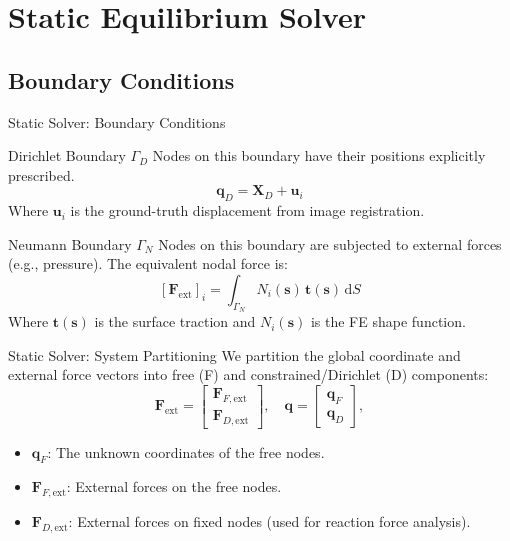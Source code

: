 \documentclass{beamer}
\begin{document}
\section{Static Equilibrium Solver}
\subsection{Boundary Conditions}

\begin{frame}[fragile]{Static Solver: Boundary Conditions}
    \begin{block}{Dirichlet Boundary $\Gamma_D$}
    Nodes on this boundary have their positions explicitly prescribed.
    \[
        \mathbf{q}_D = \mathbf{X}_D + \mathbf{u}_i
    \]
    Where $\mathbf{u}_i$ is the ground-truth displacement from image registration.
    \end{block}
    
    \begin{block}{Neumann Boundary $\Gamma_N$}
    Nodes on this boundary are subjected to external forces (e.g., pressure). The equivalent nodal force is:
    \[
        [\mathbf{F}_{\text{ext}}]_i = \int_{\Gamma_N} N_i(\mathbf{s})\,\mathbf{t}(\mathbf{s})\,\mathrm{d}S
    \]
    Where $\mathbf{t}(\mathbf{s})$ is the surface traction and $N_i(\mathbf{s})$ is the FE shape function.
    \end{block}
\end{frame}

\begin{frame}[fragile]{Static Solver: System Partitioning}
    We partition the global coordinate and external force vectors into free (F) and constrained/Dirichlet (D) components:
    \[
      \mathbf{F}_{\text{ext}} = 
      \begin{bmatrix}
          \mathbf{F}_{F,\text{ext}}\\[4pt]
          \mathbf{F}_{D,\text{ext}}
      \end{bmatrix},
      \quad
      \mathbf{q} = 
      \begin{bmatrix}
          \mathbf{q}_F\\[2pt]
          \mathbf{q}_D
      \end{bmatrix},
    \]
    \begin{itemize}
        \item $\mathbf{q}_F$: The unknown coordinates of the free nodes.
        \item $\mathbf{F}_{F,\text{ext}}$: External forces on the free nodes.
        \item $\mathbf{F}_{D,\text{ext}}$: External forces on fixed nodes (used for reaction force analysis).
    \end{itemize}
\end{frame}
\end{document}

